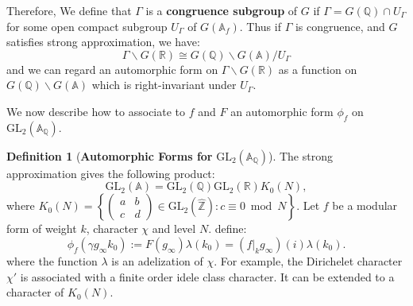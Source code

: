\documentclass[11pt,english]{smfart}
\theoremstyle{definition}
\newtheorem{definition}{Definition}
\theoremstyle{remark}
\begin{document}
Therefore, We define that $ \Gamma $ is a \textbf{congruence subgroup} of $ G $ if $ \Gamma=G(\mathbb{Q}) \cap U_{\Gamma} $ for some open compact subgroup $ U_{\Gamma} $ of $ G\left(\mathbb{A}_{f}\right) .$
Thus if $ \Gamma $ is congruence, and $ G $ satisfies strong approximation, we have:
\[\Gamma \backslash G(\mathbb{R}) \cong G(\mathbb{Q}) \backslash G(\mathbb{A}) / U_{\Gamma}\]
and we can regard an automorphic form on $ \Gamma \backslash G(\mathbb{R}) $ as a function on $ G(\mathbb{Q}) \backslash G(\mathbb{A}) $ which is right-invariant under $ U_{\Gamma} $.

We now describe how to associate to $f$ and $F$ an automorphic form $\phi_f$ on $\mathrm{GL_2}(\mathbb{A_Q}).$ 
\begin{definition}[\textbf{Automorphic Forms for} $\mathrm{GL_2}(\mathbb{A_Q})$]
The strong approximation gives the following product:
\[\mathrm{GL_2}(\mathbb{A})=\mathrm{GL_2}(\mathbb{Q})\mathrm{GL_2}(\mathbb{R})K_0(N),\]
where $ K_{0}(N)=\left\{\left(\begin{array}{ll}a & b \\ c & d\end{array}\right) \in \mathrm{GL}_{2}(\widehat{\mathbb{Z}}): c \equiv 0 \bmod N\right\}$.
Let $f$ be a modular form of weight $k$, character $\chi$ and level $N$. define:
\[\phi_{f}\left(\gamma g_{\infty} k_{0}\right):=F\left(g_{\infty}\right) \lambda\left(k_{0}\right)=\left(\left.f\right|_{k} g_{\infty}\right)(i) \lambda\left(k_{0}\right) .\]
where the function $\lambda$ is an adelization of $\chi$. For example, the Dirichelet character $\chi'$ is associated with a finite order idele class character.
It can be extended to a character of $K_0(N)$.
\end{definition}
\end{document}
